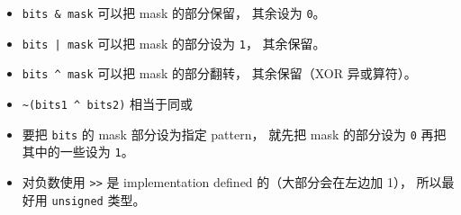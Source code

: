 
\begin{issues}
\issueDraft
\end{issues}

\begin{itemize}
\item \verb|bits & mask| 可以把 mask 的部分保留， 其余设为 \verb|0|。
\item \verb`bits | mask` 可以把 mask 的部分设为 \verb|1|， 其余保留。
\item \verb|bits ^ mask| 可以把 mask 的部分翻转， 其余保留（XOR 异或算符）。
\item \verb|~(bits1 ^ bits2)| 相当于同或
\item 要把 \verb|bits| 的 mask 部分设为指定 pattern， 就先把 mask 的部分设为 \verb|0| 再把其中的一些设为 \verb|1|。
\item 对负数使用 \verb|>>| 是 implementation defined 的（大部分会在左边加 1）， 所以最好用 \verb|unsigned| 类型。
\end{itemize}
